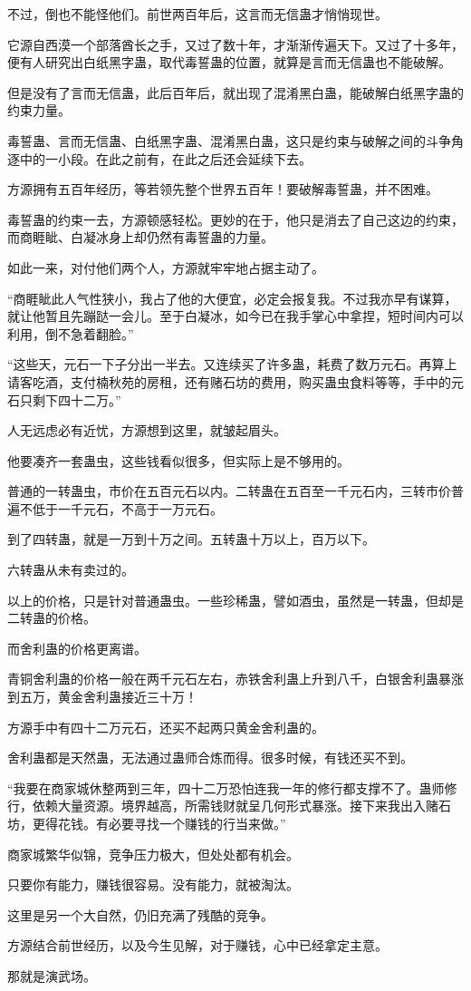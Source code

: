 \begin{this_body}
不过，倒也不能怪他们。前世两百年后，这言而无信蛊才悄悄现世。

它源自西漠一个部落酋长之手，又过了数十年，才渐渐传遍天下。又过了十多年，便有人研究出白纸黑字蛊，取代毒誓蛊的位置，就算是言而无信蛊也不能破解。

但是没有了言而无信蛊，此后百年后，就出现了混淆黑白蛊，能破解白纸黑字蛊的约束力量。

毒誓蛊、言而无信蛊、白纸黑字蛊、混淆黑白蛊，这只是约束与破解之间的斗争角逐中的一小段。在此之前有，在此之后还会延续下去。

方源拥有五百年经历，等若领先整个世界五百年！要破解毒誓蛊，并不困难。

毒誓蛊的约束一去，方源顿感轻松。更妙的在于，他只是消去了自己这边的约束，而商睚眦、白凝冰身上却仍然有毒誓蛊的力量。

如此一来，对付他们两个人，方源就牢牢地占据主动了。

“商睚眦此人气性狭小，我占了他的大便宜，必定会报复我。不过我亦早有谋算，就让他暂且先蹦跶一会儿。至于白凝冰，如今已在我手掌心中拿捏，短时间内可以利用，倒不急着翻脸。”

“这些天，元石一下子分出一半去。又连续买了许多蛊，耗费了数万元石。再算上请客吃酒，支付楠秋苑的房租，还有赌石坊的费用，购买蛊虫食料等等，手中的元石只剩下四十二万。”

人无远虑必有近忧，方源想到这里，就皱起眉头。

他要凑齐一套蛊虫，这些钱看似很多，但实际上是不够用的。

普通的一转蛊虫，市价在五百元石以内。二转蛊在五百至一千元石内，三转市价普遍不低于一千元石，不高于一万元石。

到了四转蛊，就是一万到十万之间。五转蛊十万以上，百万以下。

六转蛊从未有卖过的。

以上的价格，只是针对普通蛊虫。一些珍稀蛊，譬如酒虫，虽然是一转蛊，但却是二转蛊的价格。

而舍利蛊的价格更离谱。

青铜舍利蛊的价格一般在两千元石左右，赤铁舍利蛊上升到八千，白银舍利蛊暴涨到五万，黄金舍利蛊接近三十万！

方源手中有四十二万元石，还买不起两只黄金舍利蛊的。

舍利蛊都是天然蛊，无法通过蛊师合炼而得。很多时候，有钱还买不到。

“我要在商家城休整两到三年，四十二万恐怕连我一年的修行都支撑不了。蛊师修行，依赖大量资源。境界越高，所需钱财就呈几何形式暴涨。接下来我出入赌石坊，更得花钱。有必要寻找一个赚钱的行当来做。”

商家城繁华似锦，竞争压力极大，但处处都有机会。

只要你有能力，赚钱很容易。没有能力，就被淘汰。

这里是另一个大自然，仍旧充满了残酷的竞争。

方源结合前世经历，以及今生见解，对于赚钱，心中已经拿定主意。

那就是演武场。

\end{this_body}


